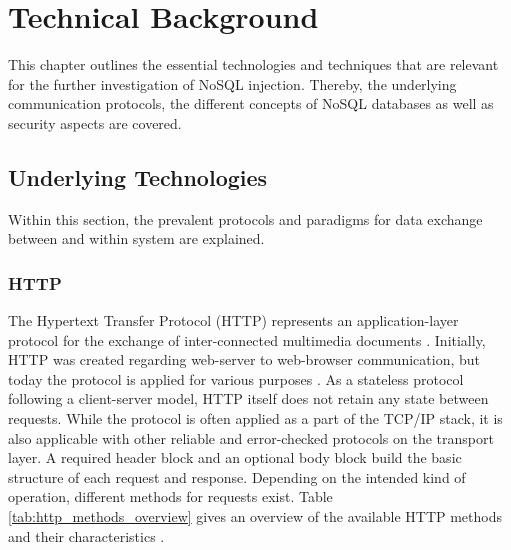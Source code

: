 \chapter{Technical Background}
\label{cha:technicalBackground}
This chapter outlines the essential technologies and techniques that are relevant for the further investigation of NoSQL injection. Thereby, the underlying communication protocols, the different concepts of NoSQL databases as well as security aspects are covered.

\section{Underlying Technologies}
Within this section, the prevalent protocols and paradigms for data exchange between and within system are explained.

\subsection{HTTP}
The Hypertext Transfer Protocol (HTTP) represents an application-layer protocol for the exchange of inter-connected multimedia documents \cite{Berners-Lee1996}. Initially, HTTP was created regarding web-server to web-browser communication, but today the protocol is applied for various purposes \cite{Fielding:1999}. As a stateless protocol following a client-server model, HTTP itself does not retain any state between requests. While the protocol is often applied as a part of the TCP/IP stack, it is also applicable with other reliable and error-checked protocols on the transport layer. A required header block and an optional body block build the basic structure of each request and response. Depending on the intended kind of operation, different methods for requests exist. Table \ref{tab:http_methods_overview} gives an overview of the available HTTP methods and their characteristics \cite{Fielding:1999}.\\

